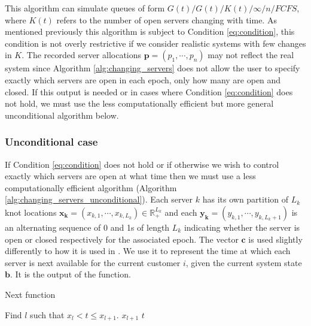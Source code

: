 \documentclass[article]{jss}
\begin{document}
This algorithm can simulate queues of form $G(t)/G(t)/K(t)/\infty/n/FCFS$, where $K(t)$ refers to the number of open servers changing with time. As mentioned previously this algorithm is subject to Condition \ref{eq:condition}, this condition is not overly restrictive if we consider realistic systems with few changes in $K$. The recorded server allocations $\mathbf{p} = (p_1, \cdots, p_n)$ may not reflect the real system since Algorithm \ref{alg:changing_servers} does not allow the user to specify exactly which servers are open in each epoch, only how many are open and closed. If this output is needed or in cases where Condition \ref{eq:condition} does not hold, we must use the less computationally efficient but more general unconditional algorithm below.  

\subsubsection{Unconditional case}

If Condition \ref{eq:condition} does not hold or if otherwise we wish to control exactly which servers are open at what time then we must use a less computationally efficient algorithm (Algorithm \ref{alg:changing_servers_unconditional}). Each server $k$ has its own partition of $L_k$ knot locations $\mathbf{x_k} = (x_{k,1}, \cdots, x_{k,L_k} ) \in \mathbb{R}^{L_k}_{+}$ and each $\mathbf{y_k} = (y_{k,1}, \cdots, y_{k,L_k+1} )$ is an alternating sequence of 0 and 1s of length $L_k$ indicating whether the server is open or closed respectively for the associated epoch. The vector $\mathbf{c}$ is used slightly differently to how it is used in \citet{sutton_bayesian_2011}. We use it to represent the time at which each server is next available for the current customer $i$, given the current system state $\mathbf{b}$. It is the output of the  function. 

\begin{algorithm}[ht!]
\caption{Next function}
\label{alg:next_fun}
\begin{algorithmic}
\State Find $l$ such that $x_{l} < t \leq x_{l+1}$.
\State \Return $x_{l+1}$
\Else
\State \Return $t$
\EndIf
\EndFunction
\end{algorithmic}
\end{algorithm}
\end{document}
